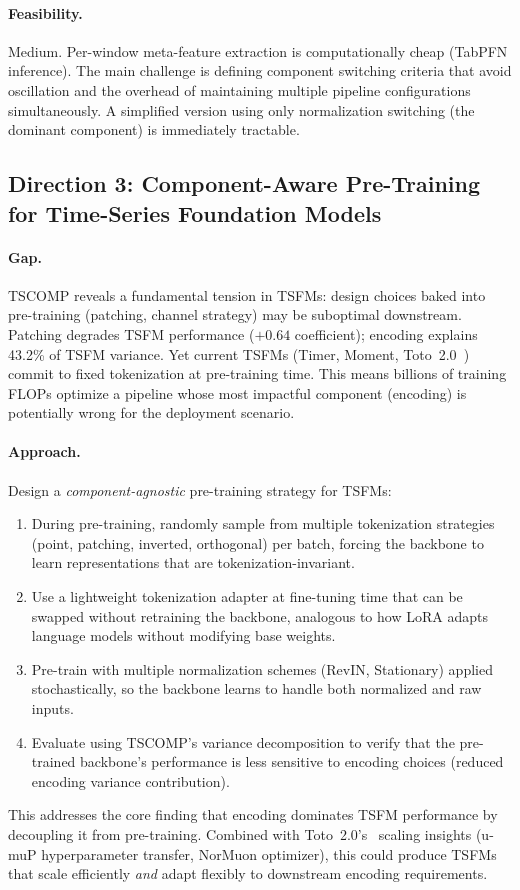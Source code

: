 \documentclass[11pt,a4paper]{article}
\begin{document}
\paragraph{Feasibility.} Medium. Per-window meta-feature extraction is computationally cheap (TabPFN inference). The main challenge is defining component switching criteria that avoid oscillation and the overhead of maintaining multiple pipeline configurations simultaneously. A simplified version using only normalization switching (the dominant component) is immediately tractable.

\subsection{Direction 3: Component-Aware Pre-Training for Time-Series Foundation Models}

\paragraph{Gap.} TSCOMP reveals a fundamental tension in TSFMs: design choices baked into pre-training (patching, channel strategy) may be suboptimal downstream. Patching degrades TSFM performance ($+0.64$ coefficient); encoding explains 43.2\% of TSFM variance. Yet current TSFMs (Timer, Moment, Toto~2.0~\cite{toto2026}) commit to fixed tokenization at pre-training time. This means billions of training FLOPs optimize a pipeline whose most impactful component (encoding) is potentially wrong for the deployment scenario.

\paragraph{Approach.} Design a \emph{component-agnostic} pre-training strategy for TSFMs:
\begin{enumerate}
\item During pre-training, randomly sample from multiple tokenization strategies (point, patching, inverted, orthogonal) per batch, forcing the backbone to learn representations that are tokenization-invariant.
\item Use a lightweight tokenization adapter at fine-tuning time that can be swapped without retraining the backbone, analogous to how LoRA adapts language models without modifying base weights.
\item Pre-train with multiple normalization schemes (RevIN, Stationary) applied stochastically, so the backbone learns to handle both normalized and raw inputs.
\item Evaluate using TSCOMP's variance decomposition to verify that the pre-trained backbone's performance is less sensitive to encoding choices (reduced encoding variance contribution).
\end{enumerate}
This addresses the core finding that encoding dominates TSFM performance by decoupling it from pre-training. Combined with Toto~2.0's~\cite{toto2026} scaling insights (u-muP hyperparameter transfer, NorMuon optimizer), this could produce TSFMs that scale efficiently \emph{and} adapt flexibly to downstream encoding requirements.
\end{document}
